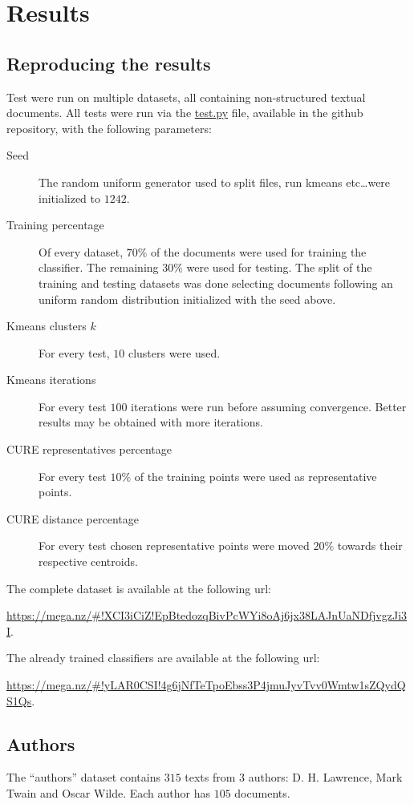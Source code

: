 \documentclass[\main/main.tex]{subfiles}
\begin{document}
\chapter{Results}
\section{Reproducing the results}
Test were run on multiple datasets, all containing non-structured textual documents. All tests were run via the \href{https://github.com/LucaCappelletti94/zipf_classifier/blob/master/test.py}{test.py} file, available in the github repository, with the following parameters:
\begin{description}
	\item[Seed] The random uniform generator used to split files, run kmeans etc\ldots were initialized to \(1242\).
	\item[Training percentage] Of every dataset, \(70\%\) of the documents were used for training the classifier. The remaining \(30\%\) were used for testing. The split of the training and testing datasets was done selecting documents following an uniform random distribution initialized with the seed above.
	\item[Kmeans clusters \(k\)] For every test, \(10\) clusters were used.
	\item[Kmeans iterations] For every test \(100\) iterations were run before assuming convergence. Better results may be obtained with more iterations.
	\item[CURE representatives percentage] For every test \(10\%\) of the training points were used as representative points.
	\item[CURE distance percentage] For every test chosen representative points were moved \(20\%\) towards their respective centroids.
\end{description}

The complete dataset is available at the following url:

\url{https://mega.nz/#!XCI3iCiZ!EpBtedozqBivPcWYi8oAj6jx38LAJnUaNDfjvgzJi3I}.

The already trained classifiers are available at the following url:

\url{https://mega.nz/#!yLAR0CSI!4g6jNfTeTpoEbss3P4jmuJyvTvv0Wmtw1sZQydQS1Qs}.

\clearpage
\section{Authors}
The ``authors'' dataset contains \(315\) texts from 3 authors: D. H. Lawrence, Mark Twain and Oscar Wilde. Each author has \(105\) documents.
\end{document}
